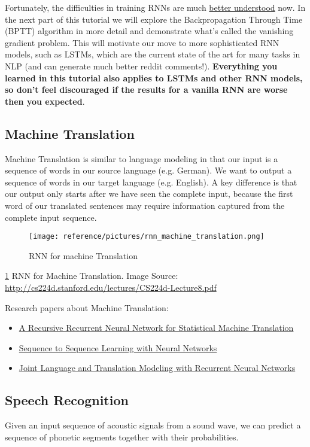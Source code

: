 \documentclass[10pt,a4paper]{ctexbook}
\begin{document}
Fortunately, the difficulties in training RNNs are much \href{http://arxiv.org/abs/1211.5063}{better understood} now. In the next part of this tutorial we will explore the Backpropagation Through Time (BPTT) algorithm in more detail and demonstrate what's called the vanishing gradient problem. This will motivate our move to more sophisticated RNN models, such as LSTMs, which are the current state of the art for many tasks in NLP (and can generate much better reddit comments!). \textbf{Everything you learned in this tutorial also applies to LSTMs and other RNN models, so don't feel discouraged if the results for a vanilla RNN are worse then you expected}.


\subsection{Machine Translation}
Machine Translation is similar to language modeling in that our input is a sequence of words in our source language (e.g. German). We want to output a sequence of words in our target language (e.g. English). A key difference is that our output only starts after we have seen the complete input, because the first word of our translated sentences may require information captured from the complete input sequence.

\begin{figure}[ht]
    \centering
    \texttt{[image: reference/pictures/rnn\_machine\_translation.png]}
    \caption{RNN for machine Translation}
    \label{fig:rnn_machine_translation}
\end{figure}
\ref{fig:rnn_machine_translation} RNN for Machine Translation. Image Source: \url{http://cs224d.stanford.edu/lectures/CS224d-Lecture8.pdf}


Research papers about Machine Translation:
\begin{itemize}
\item \href{http://www.aclweb.org/anthology/P14-1140.pdf}{A Recursive Recurrent Neural Network for Statistical Machine Translation}
\item \href{http://papers.nips.cc/paper/5346-sequence-to-sequence-learning-with-neural-networks.pdf}{Sequence to Sequence Learning with Neural Networks}
\item \href{http://research.microsoft.com/en-us/um/people/gzweig/Pubs/EMNLP2013RNNMT.pdf}{Joint Language and Translation Modeling with Recurrent Neural Networks}
\end{itemize}

\subsection{Speech Recognition}
Given an input sequence of acoustic signals from a sound wave, we can predict a sequence of phonetic segments together with their probabilities.
\end{document}
